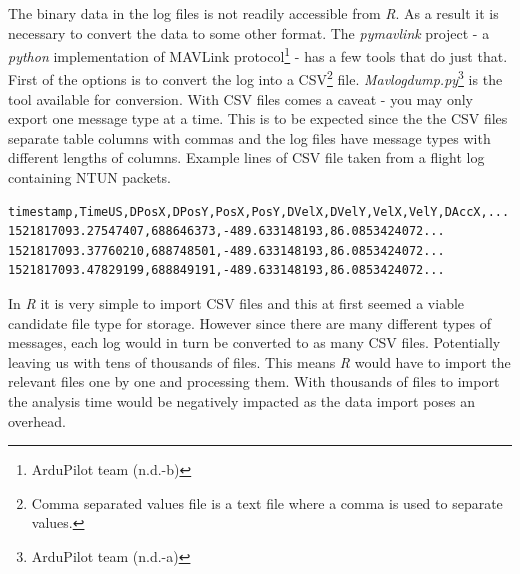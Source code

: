 \documentclass[12pt,oneside]{reedthesis}
\theoremstyle{definition}
\theoremstyle{definition}
\theoremstyle{definition}
\theoremstyle{remark}
\begin{document}
The binary data in the log files is not readily accessible from
\emph{R}. As a result it is necessary to convert the data to some other
format. The \emph{pymavlink} project - a \emph{python} implementation of
MAVLink protocol\footnote{ArduPilot team (n.d.-b)} - has a few tools
that do just that. First of the options is to convert the log into a
CSV\footnote{Comma separated values file is a text file where a comma is
  used to separate values.} file. \emph{Mavlogdump.py}\footnote{ArduPilot
  team (n.d.-a)} is the tool available for conversion. With CSV files
comes a caveat - you may only export one message type at a time. This is
to be expected since the the CSV files separate table columns with
commas and the log files have message types with different lengths of
columns. Example lines of CSV file taken from a flight log containing
NTUN packets.
\begin{verbatim}
timestamp,TimeUS,DPosX,DPosY,PosX,PosY,DVelX,DVelY,VelX,VelY,DAccX,...
1521817093.27547407,688646373,-489.633148193,86.0853424072...
1521817093.37760210,688748501,-489.633148193,86.0853424072...
1521817093.47829199,688849191,-489.633148193,86.0853424072...
\end{verbatim}
In \emph{R} it is very simple to import CSV files and this at first
seemed a viable candidate file type for storage. However since there are
many different types of messages, each log would in turn be converted to
as many CSV files. Potentially leaving us with tens of thousands of
files. This means \emph{R} would have to import the relevant files one
by one and processing them. With thousands of files to import the
analysis time would be negatively impacted as the data import poses an
overhead.
\end{document}
